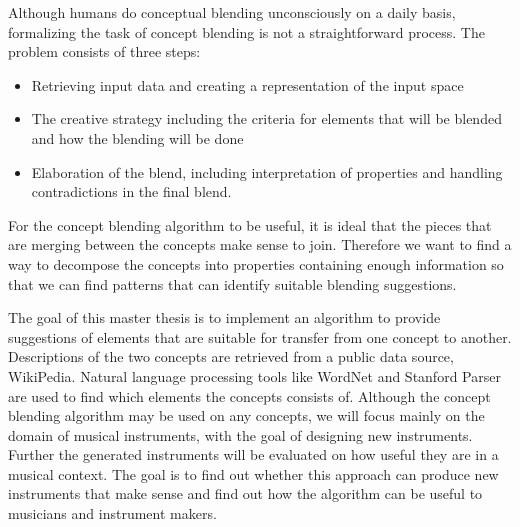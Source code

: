 Although humans do conceptual blending unconsciously on a daily basis, formalizing the task of concept blending is not a straightforward process. The problem consists of three steps: \begin{itemize}
	\item Retrieving input data and creating a representation of the input space
	\item The creative strategy including the criteria for elements that will be blended and how the blending will be done
	\item Elaboration of the blend, including interpretation of properties and handling contradictions in the final blend.
\end{itemize}

For the concept blending algorithm to be useful, it is ideal that the pieces that are merging between the concepts make sense to join. Therefore we want to find a way to decompose the concepts into properties containing enough information so that we can find patterns that can identify suitable blending suggestions. %

The goal of this master thesis is to implement an algorithm to provide suggestions of elements that are suitable for transfer from one concept to another. Descriptions of the two concepts are retrieved from a public data source, WikiPedia. Natural language processing tools like WordNet and Stanford Parser are used to find which elements the concepts consists of. Although the concept blending algorithm may be used on any concepts, we will focus mainly on the domain of musical instruments, with the goal of designing new instruments. Further the generated instruments will be evaluated on how useful they are in a musical context. The goal is to find out whether this approach can produce new instruments that make sense and find out how the algorithm can be useful to musicians and instrument makers.


